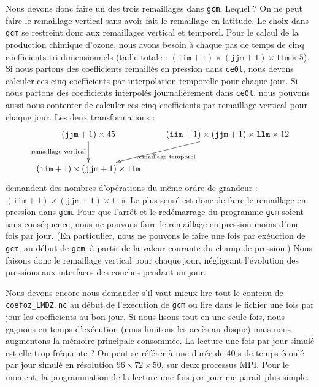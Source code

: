 \documentclass[a4paper,english,french]{article}
\begin{document}
Nous devons donc faire un des trois remaillages dans \verb+gcm+.
Lequel ? On ne peut faire le remaillage vertical sans avoir fait le
remaillage en latitude. Le choix dans \verb+gcm+ se restreint donc aux
remaillages vertical et temporel. Pour le calcul de la production
chimique d'ozone, nous avons besoin à chaque pas de temps de cinq
coefficients tri-dimensionnels (taille totale : $(\mathtt{iim} + 1)
\times (\mathtt{jjm} + 1) \times \mathtt{llm} \times 5$). Si nous
partons des coefficients remaillés en pression dans \verb+ce0l+,
nous devons calculer ces cinq coefficients par interpolation
temporelle pour chaque jour. Si nous partons des coefficients
interpolés journalièrement dans \verb+ce0l+, nous pouvons aussi
nous contenter de calculer ces cinq coefficients par remaillage
vertical pour chaque jour. Les deux transformations :
\begin{displaymath}
  \xymatrix{
    (\mathtt{jjm} + 1) \times 45 \ar[d]_{\textrm{remaillage vertical}}
    & (\mathtt{iim} + 1) \times (\mathtt{jjm} + 1) \times \mathtt{llm}
    \times 12 \ar[ld]^{\textrm{remaillage temporel}} \\
    (\mathtt{iim} + 1) \times (\mathtt{jjm} + 1) \times \mathtt{llm}
  }
\end{displaymath}
demandent des nombres d'opérations du même ordre de grandeur :
$(\mathtt{iim} + 1) \times (\mathtt{jjm} + 1) \times \mathtt{llm}$. Le
plus sensé est donc de faire le remaillage en pression dans
\verb+gcm+. Pour que l'arrêt et le redémarrage du programme \verb+gcm+
soient sans conséquence, nous ne pouvons faire le remaillage en
pression moins d'une fois par jour. (En particulier, nous ne pouvons
le faire une fois par exéuction de \verb+gcm+, au début de \verb+gcm+,
à partir de la valeur courante du champ de pression.) Nous faisons
donc le remaillage vertical pour chaque jour, négligeant l'évolution
des pressions aux interfaces des couches pendant un jour.

Nous devons encore nous demander s'il vaut mieux lire tout le contenu
de \verb+coefoz_LMDZ.nc+ au début de l'exécution de \verb+gcm+ ou lire
dans le fichier une fois par jour les coefficients au bon jour. Si
nous lisons tout en une seule fois, nous gagnons en temps d'exécution
(nous limitons les accès au disque) mais nous augmentons la
\href{file:///user/guez/Documents/Around_LMDZ/taille.ods}{mémoire
  principale consommée}. La lecture une fois par jour simulé est-elle
trop fréquente ? On peut se référer à une durée de 40 s de temps
écoulé par jour simulé en résolution $96 \times 72 \times 50$, sur
deux processus MPI. Pour le moment, la programmation de la lecture une
fois par jour me paraît plus simple.
\end{document}
